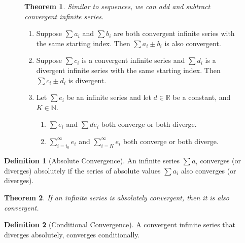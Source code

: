 \documentclass{article}
\newcommand*{\N}{\mathbb{N}}
\newcommand*{\R}{\mathbb{R}}
\theoremstyle{plain}
\newtheorem{theorem}{Theorem}[section]
\numberwithin{theorem}{subsection}
\theoremstyle{definition}
\newtheorem{definition}{Definition}[section]
\numberwithin{definition}{subsection}
\theoremstyle{remark}
\numberwithin{note}{subsection}
\begin{document}
\begin{figure}[H]
    \begin{mdframed}[style=exampledefault]
        \begin{theorem}
            Similar to sequences, we can add and subtract convergent infinite series.
        \end{theorem}

        \begin{enumerate}
            \item Suppose $\sum a_i$ and $\sum b_i$ are both convergent infinite series with the same starting index. Then $\sum a_i \pm b_i$ is also convergent.
            \item Suppose $\sum c_i$ is a convergent infinite series and $\sum d_i$ is a divergent infinite series with the same starting index. Then $\sum c_i \pm d_i$ is divergent.
            \item Let $\sum e_i$ be an infinite series and let $d\in\R$ be a constant, and $K\in\N$.
                  \begin{enumerate}
                      \item $\sum e_i$ and $\sum d e_i$ both converge or both diverge.
                      \item $\sum_{i=i_0}^\infty e_i$ and $\sum_{i=K}^\infty e_i$ both converge or both diverge.
                  \end{enumerate}
        \end{enumerate}

    \end{mdframed}
\end{figure}
%
\begin{definition}[Absolute Convergence]
    An infinite series $\sum a_i$ converges (or diverges) absolutely if the series of absolute values $\sum a_i$ also converges (or diverges).
\end{definition}
\begin{theorem}
    If an infinite series is absolutely convergent, then it is also convergent.
\end{theorem}
%
\begin{definition}[Conditional Convergence]
    A convergent infinite series that diverges absolutely, converges \linebreak conditionally.
\end{definition}
%
\pagebreak
\end{document}
